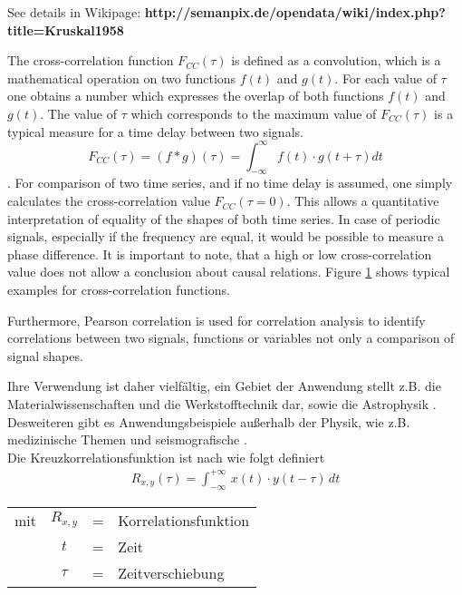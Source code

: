 \documentclass[a4paper,10pt]{scrbook}
\begin{document}
\cite{Kruskal1958}
See details in Wikipage: \textbf{http://semanpix.de/opendata/wiki/index.php?title=Kruskal1958}

The cross-correlation function $F_{CC}(\tau)$ is defined as a convolution, which is a mathematical operation on two functions $f(t)$ and $g(t)$. For each value of $\tau$ one obtains a number which expresses the overlap of both functions $f(t)$ and $g(t)$. The value of $\tau$ which corresponds to the maximum value of $F_{CC}(\tau)$ is a typical measure for a time delay between two signals. 
\begin{equation}
 F_{CC}(\tau) = (f \ast g)(\tau) = \int_{-\infty}^{\infty} f(t) \cdot g(t+\tau) dt
\end{equation}.
For comparison of two time series, and if no time delay is assumed, one simply calculates  the cross-correlation value $F_{CC}(\tau=0)$. This allows a quantitative interpretation of equality of the shapes of both time series. In case of periodic signals, especially if the frequency are equal, it would be possible to measure a phase difference. It is important to note, that a high or low cross-correlation value does not allow a conclusion about causal relations. Figure \ref{fig:example_cc} shows typical examples for cross-correlation functions.

\begin{figure}[htp]
\centering
\label{fig:example_cc}
\end{figure}

Furthermore, Pearson correlation is used for correlation analysis to identify correlations between two signals, functions or variables not only a comparison of signal shapes. 

Ihre Verwendung ist daher vielfältig, ein Gebiet der Anwendung stellt z.B. die Materialwissenschaften und die Werkstofftechnik \cite{Ultraschall} dar, sowie die Astrophysik \cite{DarkEnergy}. Desweiteren gibt es Anwendungsbeispiele außerhalb der Physik, wie z.B. medizinische Themen \cite{Psychosozial} und seismografische \cite{RandomFields}.\\
Die Kreuzkorrelationsfunktion ist nach \cite{Signaluebertragung} wie folgt definiert
\begin{align}
R_{x,y}(\tau) = \int_{- \infty}^{+ \infty} \, x(t) \cdot y(t-\tau) \, dt
\end{align}
\begin{table}[H]
\begin{tabular}{rccl}
mit  & $R_{x,y}$ & = & Korrelationsfunktion\\
	 & $t$ & = & Zeit\\
	 & $\tau$ & = & Zeitverschiebung\\
\end{tabular}
\end{table}
\end{document}
